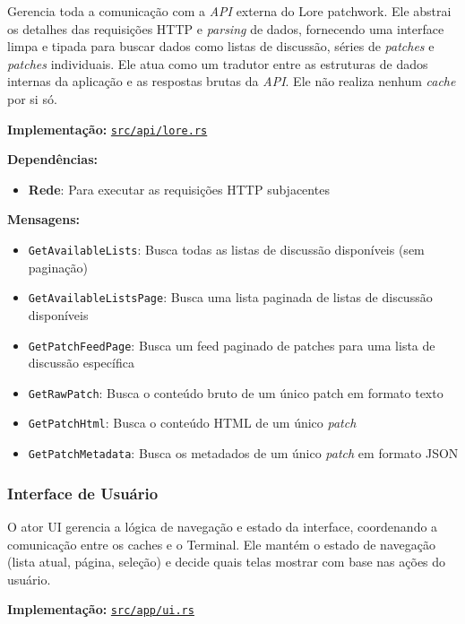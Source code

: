 Gerencia toda a comunicação com a \emph{API} externa do Lore patchwork. Ele abstrai os detalhes das requisições HTTP e \emph{parsing} de dados, fornecendo uma interface limpa e tipada para buscar dados como listas de discussão, séries de \emph{patches} e \emph{patches} individuais. Ele atua como um tradutor entre as estruturas de dados internas da aplicação e as respostas brutas da \emph{API}. Ele não realiza nenhum \emph{cache} por si só.

\textbf{Implementação:} \href{https://github.com/nahharris/ph-actors-tcc/blob/master/src/api/lore.rs}{\texttt{src/api/lore.rs}}

\textbf{Dependências:}

\begin{itemize}
    \item \textbf{Rede}: Para executar as requisições HTTP subjacentes
\end{itemize}

\textbf{Mensagens:}

\begin{itemize}
    \item \texttt{GetAvailableLists}: Busca todas as listas de discussão disponíveis (sem paginação)
    \item \texttt{GetAvailableListsPage}: Busca uma lista paginada de listas de discussão disponíveis
    \item \texttt{GetPatchFeedPage}: Busca um feed paginado de patches para uma lista de discussão específica
    \item \texttt{GetRawPatch}: Busca o conteúdo bruto de um único patch em formato texto
    \item \texttt{GetPatchHtml}: Busca o conteúdo HTML de um único \emph{patch}
    \item \texttt{GetPatchMetadata}: Busca os metadados de um único \emph{patch} em formato JSON
\end{itemize}

\subsubsection{Interface de Usuário}

O ator UI gerencia a lógica de navegação e estado da interface, coordenando a comunicação entre os caches e o Terminal. Ele mantém o estado de navegação (lista atual, página, seleção) e decide quais telas mostrar com base nas ações do usuário.

\textbf{Implementação:} \href{https://github.com/nahharris/ph-actors-tcc/blob/master/src/app/ui.rs}{\texttt{src/app/ui.rs}}

